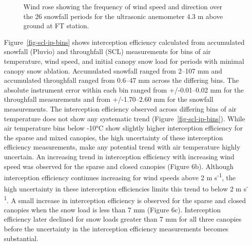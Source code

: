 \documentclass[
  letterpaper,
  DIV=11,
  numbers=noendperiod]{scrartcl}
\begin{document}

\begin{figure}[H]


\caption{\label{fig-wind-rose}Wind rose showing the frequency of wind
speed and direction over the 26 snowfall periods for the ultrasonic
anemometer 4.3 m above ground at FT station.}

\end{figure}%

Figure~\ref{fig-scl-ip-bins} shows interception efficiency calculated
from accumulated snowfall (Pluvio) and throughfall (SCL) measurements
for bins of air temperature, wind speed, and initial canopy snow load
for periods with minimal canopy snow ablation. Accumulated snowfall
ranged from 2--107 mm and accumulated throughfall ranged from 0.6--47 mm
across the differing bins. The absolute instrument error within each bin
ranged from +/-0.01--0.02 mm for the throughfall measurements and from
+/-1.70--2.60 mm for the snowfall measurements. The interception
efficiency observed across differing bins of air temperature does not
show any systematic trend (Figure~\ref{fig-scl-ip-bins}). While air
temperature bins below -10°C show slightly higher interception
efficiency for the sparse and mixed canopies, the high uncertainty of
these interception efficiency measurements, make any potential trend
with air temperature highly uncertain. An increasing trend in
interception efficiency with increasing wind speed was observed for the
sparse and closed canopies (Figure 6b). Although interception efficiency
continues increasing for wind speeds above 2 m s\textsuperscript{-1},
the high uncertainty in these interception efficiencies limits this
trend to below 2 m s\textsuperscript{-1}. A small increase in
interception efficiency is observed for the sparse and closed canopies
when the snow load is less than 7 mm (Figure 6c). Interception
efficiency later declined for snow loads greater than 7 mm for all three
canopies before the uncertainty in the interception efficiency
measurements becomes substantial.
\end{document}
